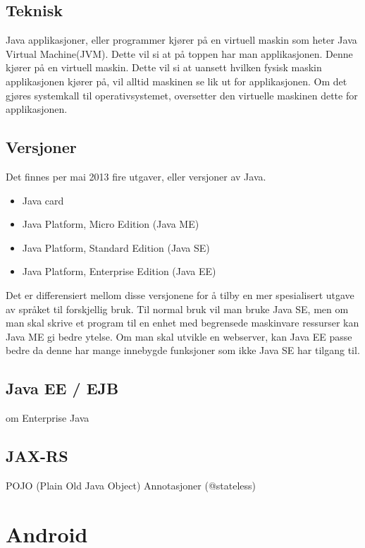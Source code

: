 \documentclass[../main.tex]{subfiles}
\begin{document}
\subsection{Teknisk}
Java applikasjoner, eller programmer kjører på en virtuell maskin som heter Java Virtual Machine(JVM). Dette vil si at på toppen har man applikasjonen. Denne kjører på en virtuell maskin. Dette vil si at uansett hvilken fysisk maskin applikasjonen kjører på, vil alltid maskinen se lik ut for applikasjonen. Om det gjøres systemkall til operativsystemet, oversetter den virtuelle maskinen dette for applikasjonen.

\subsection{Versjoner}
Det finnes per mai 2013 fire utgaver, eller versjoner av Java.
\begin{itemize}
\item Java card
\item Java Platform, Micro Edition (Java ME)
\item Java Platform, Standard Edition (Java SE)
\item Java Platform, Enterprise Edition (Java EE)
\end{itemize}

Det er differensiert mellom disse versjonene for å tilby en mer spesialisert utgave av språket til forskjellig bruk. Til normal bruk vil man bruke Java SE, men om man skal skrive et program til en enhet med begrensede maskinvare ressurser kan Java ME gi bedre ytelse. Om man skal utvikle en webserver, kan Java EE passe bedre da denne har mange innebygde funksjoner som ikke Java SE har tilgang til.

\subsection{Java EE / EJB}
om Enterprise Java

\subsection{JAX-RS}
POJO (Plain Old Java Object) 
Annotasjoner (@stateless)

\section{Android}
\end{document}
